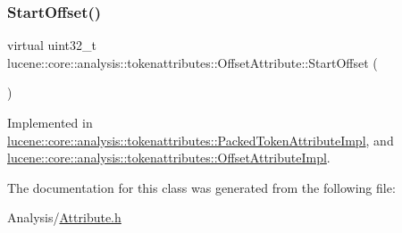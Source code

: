 \subsubsection{\texorpdfstring{Start\+Offset()}{StartOffset()}}
{\footnotesize\ttfamily virtual uint32\+\_\+t lucene\+::core\+::analysis\+::tokenattributes\+::\+Offset\+Attribute\+::\+Start\+Offset (\begin{DoxyParamCaption}{ }\end{DoxyParamCaption})\hspace{0.3cm}{\ttfamily [pure virtual]}}



Implemented in \mbox{\hyperlink{classlucene_1_1core_1_1analysis_1_1tokenattributes_1_1PackedTokenAttributeImpl_aea927563f771802e2ea6356814b53c17}{lucene\+::core\+::analysis\+::tokenattributes\+::\+Packed\+Token\+Attribute\+Impl}}, and \mbox{\hyperlink{classlucene_1_1core_1_1analysis_1_1tokenattributes_1_1OffsetAttributeImpl_afe05dd1af07cc98ff4baceb531ae5f0a}{lucene\+::core\+::analysis\+::tokenattributes\+::\+Offset\+Attribute\+Impl}}.



The documentation for this class was generated from the following file\+:\begin{DoxyCompactItemize}
\item 
Analysis/\mbox{\hyperlink{Analysis_2Attribute_8h}{Attribute.\+h}}\end{DoxyCompactItemize}

